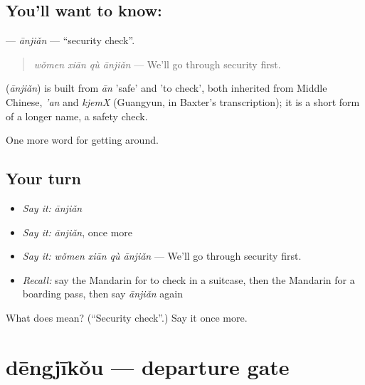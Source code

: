 \subsection*{You'll want to know: }
\textbf{} — \emph{ānjiǎn} — \textquotedblleft{}security check\textquotedblright{}.

\begin{quote}
\textbf{} \emph{wǒmen xiān qù ānjiǎn} — We'll go through security first.
\end{quote}

\begin{cousinweb}
\textbf{} (\emph{ānjiǎn}) is built from \emph{ān} 'safe' and  'to check', both inherited from Middle Chinese, \emph{'an} and \emph{kjemX} (Guangyun, in Baxter's transcription); it is a short form of a longer name, a safety check.
\end{cousinweb}

\begin{grammarlens}[title={What you've built}]
One more word for getting around.
\end{grammarlens}

\subsection*{Your turn}
\begin{itemize}
\raggedright
  \item \emph{Say it:} \emph{ānjiǎn}
  \item \emph{Say it:} \emph{ānjiǎn}, once more
  \item \emph{Say it:} \emph{wǒmen xiān qù ānjiǎn} — We'll go through security first.
  \item \emph{Recall:} say the Mandarin for to check in a suitcase, then the Mandarin for a boarding pass, then say \emph{ānjiǎn} again
\end{itemize}

\begin{tcolorbox}[breakable,colback=teal!4,colframe=teal!35!black,title={Before you move on}]
What does  mean? (\textquotedblleft{}Security check\textquotedblright{}.) Say it once more.
\end{tcolorbox}
\section[dēngjīkǒu]{dēngjīkǒu — departure gate}

\label{lesson:ZH-C415-dengjikou}



